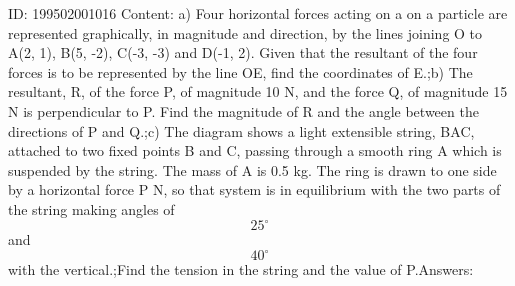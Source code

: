 \documentclass{article}
\begin{document}
ID: 199502001016
Content:
a) Four horizontal forces acting on a on a particle are represented graphically, in magnitude and direction, by the lines joining O to A(2, 1), B(5, -2), C(-3, -3) and D(-1, 2). Given that the resultant of the four forces is to be represented by the line OE, find the coordinates of E.;b) The resultant, R, of the force P, of magnitude 10 N, and the force Q, of magnitude 15 N is perpendicular to P. Find the magnitude of R and the angle between the directions of P and Q.;c) The diagram shows a light extensible string, BAC, attached to two fixed points B and C, passing through a smooth ring A which is suspended by the string. The mass of A is 0.5 kg. The ring is drawn to one side by a horizontal force P N, so that system is in equilibrium with the two parts of the string making angles of \[25^{\circ}\]  and \[40^{\circ}\]  with the vertical.;Find the tension in the string and the value of P.Answers:
\end{document}
